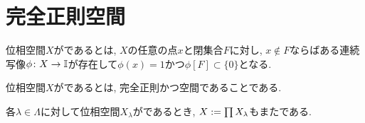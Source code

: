 \documentclass[uplatex, dvipdfmx, a4paper, 12pt, class=jsbook, crop=false]{standalone}
\begin{document}
\section{完全正則空間}
\label{sec:completely-regular-spaces}

\begin{definition}
	位相空間$ X $がであるとは, $ X $の任意の点$ x $と閉集合$ F $に対し, $ x \not\in F $ならばある連続写像$ \phi \colon X \rightarrow \mathbb{I} $が存在して$ \phi (x) = 1 $かつ$ \phi[F] \subset \{0\} $となる.
\end{definition}

\begin{definition}
	位相空間$ X $がであるとは, 完全正則かつ空間であることである.
\end{definition}

\begin{proposition}
	\label{prop:A product space of every T3.5 space is T3.5}
	各$ \lambda \in \Lambda $に対して位相空間$ X_\lambda $がであるとき, $ X \mathrel{:=} \prod X_\lambda $もまたである.
\end{proposition}
\end{document}
